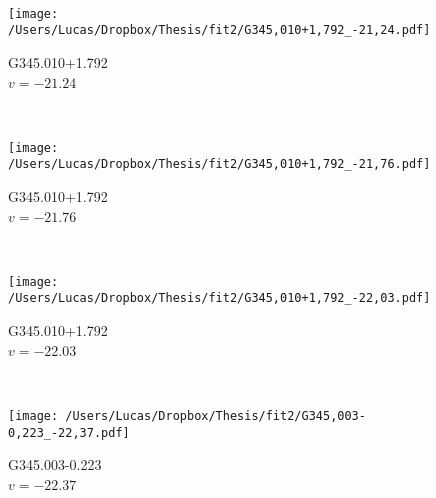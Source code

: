 \begin{figure*}[t]
\begin{subfigure}[t]{0.3\textwidth}
	\end{subfigure}
	~
	\begin{subfigure}[t]{0.3\textwidth}
		\texttt{[image: /Users/Lucas/Dropbox/Thesis/fit2/G345,010+1,792\_-21,24.pdf]}
		\caption[]{G345.010+1.792\\$v=-21.24$\,\kms}
	\end{subfigure}
	~
	\begin{subfigure}[t]{0.3\textwidth}
		\texttt{[image: /Users/Lucas/Dropbox/Thesis/fit2/G345,010+1,792\_-21,76.pdf]}
		\caption[]{G345.010+1.792\\$v=-21.76$\,\kms}
	\end{subfigure}
	~
	\begin{subfigure}[t]{0.3\textwidth}
		\texttt{[image: /Users/Lucas/Dropbox/Thesis/fit2/G345,010+1,792\_-22,03.pdf]}
		\caption[]{G345.010+1.792\\$v=-22.03$\,\kms}
	\end{subfigure}
	~
	\begin{subfigure}[t]{0.3\textwidth}
		\texttt{[image: /Users/Lucas/Dropbox/Thesis/fit2/G345,003-0,223\_-22,37.pdf]}
		\caption[]{G345.003-0.223\\$v=-22.37$\,\kms}
	\end{subfigure}
	~
\end{figure*}
\clearpage
